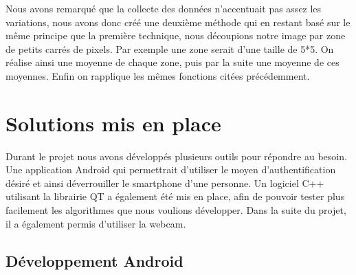 Nous avons remarqué que la collecte des données n'accentuait pas assez les variations, nous avons donc créé une deuxième méthode qui en restant basé sur le même principe que la première technique, nous découpions notre image
par zone de petits carrés de pixels. Par exemple une zone serait d'une taille de 5*5. On réalise 
ainsi une moyenne de chaque zone, puis par la suite une moyenne de ces moyennes. Enfin on rapplique
les mêmes fonctions citées précédemment.

\section{Solutions mis en place}

Durant le projet nous avons développés plusieurs outils pour répondre au besoin. Une application Android qui permettrait d'utiliser le moyen d'authentification désiré et ainsi déverrouiller le smartphone d'une
personne. Un logiciel C++ utilisant la librairie QT a également été mis en place, afin de pouvoir tester plus facilement les algorithmes que nous voulions développer. Dans la suite du projet, il a également
permis d'utiliser la webcam. 

\subsection{Développement Android}

